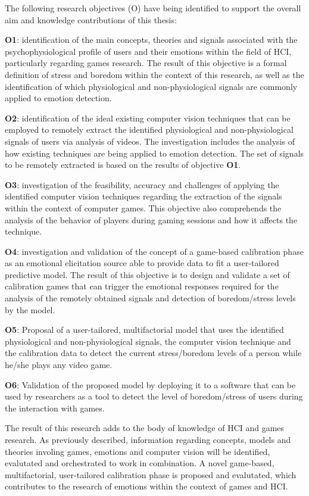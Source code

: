 The following research objectives (O) have being identified to support the overall aim and knowledge contributions of this thesis:

\textbf{O1}: identification of the main concepts, theories and signals associated with the psychophysiological profile of users and their emotions within the field of HCI, particularly regarding games research. The result of this objective is a formal definition of stress and boredom within the context of this research, as well as the identification of which physiological and non-physiological signals are commonly applied to emotion detection.

\textbf{O2}: identification of the ideal existing computer vision techniques that can be employed to remotely extract the identified physiological and non-physiological signals of users via analysis of videos. The investigation includes the analysis of how existing techniques are being applied to emotion detection. The set of signals to be remotely extracted is based on the results of objective \textbf{O1}.

\textbf{O3}: investigation of the feasibility, accuracy and challenges of applying the identified computer vision techniques regarding the extraction of the signals within the context of computer games. This objective also comprehends the analysis of the behavior of players during gaming sessions and how it affects the technique.

\textbf{O4}: investigation and validation of the concept of a game-based calibration phase as an emotional elicitation source able to provide data to fit a user-tailored predictive model. The result of this objective is to design and validate a set of calibration games that can trigger the emotional responses required for the analysis of the remotely obtained signals and detection of boredom/stress levels by the model.

\textbf{O5}: Proposal of a user-tailored, multifactorial model that uses the identified physiological and non-physiological signals, the computer vision technique and the calibration data to detect the current stress/boredom levels of a person while he/she plays any video game.

\textbf{O6}: Validation of the proposed model by deploying it to a software that can be used by researchers as a tool to detect the level of boredom/stress of users during the interaction with games.

The result of this research adds to the body of knowledge of HCI and games research. As previously described, information regarding concepts, models and theories involing games, emotions and computer vision will be identified, evalutated and orchestrated to work in combination. A novel game-based, multifactorial, user-tailored calibration phase is proposed and evalutated, which contributes to the research of emotions within the context of games and HCI.

